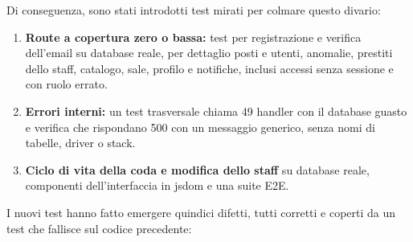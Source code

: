 \documentclass[11pt,a4paper,oneside,openany]{book}
\begin{document}
Di conseguenza, sono stati introdotti test mirati per colmare questo
divario:
\begin{enumerate}
  \item \textbf{Route a copertura zero o bassa:} test per registrazione e
        verifica dell'email su database reale, per dettaglio posti e utenti,
        anomalie, prestiti dello staff, catalogo, sale, profilo e
        notifiche, inclusi accessi senza sessione e con ruolo errato.
  \item \textbf{Errori interni:} un test trasversale chiama 49 handler con il
        database guasto e verifica che rispondano 500 con un messaggio
        generico, senza nomi di tabelle, driver o stack.
  \item \textbf{Ciclo di vita della coda e modifica dello staff} su database
        reale, componenti dell'interfaccia in jsdom e una suite E2E.
\end{enumerate}

I nuovi test hanno fatto emergere quindici difetti, tutti corretti e coperti
da un test che fallisce sul codice precedente:
\end{document}
